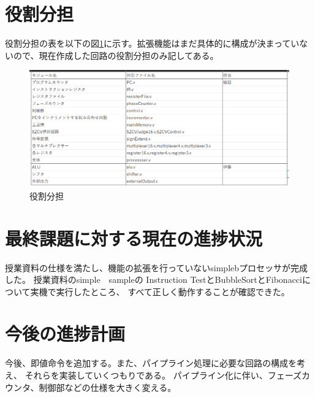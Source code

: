 \documentclass[a4j,titlepage]{jarticle}
\begin{document}
\section{役割分担}

役割分担の表を以下の図\ref{rolesDivision0422}に示す。拡張機能はまだ具体的に構成が決まっていないので、現在作成した回路の役割分担のみ記してある。




\begin{figure}[H]
    \begin{center}
        \includegraphics[scale = 0.43]{rolesDivision0506.png}
    \end{center}
    \caption{役割分担}
    \label{rolesDivision0422}
\end{figure}

\section{最終課題に対する現在の進捗状況}
授業資料の仕様を満たし、機能の拡張を行っていないsimplebプロセッサが完成した。
授業資料のsimple　sampleの
Instruction TestとBubbleSortとFibonacciについて実機で実行したところ、
すべて正しく動作することが確認できた。
\section{今後の進捗計画}
今後、即値命令を追加する。また、パイプライン処理に必要な回路の構成を考え、
それらを実装していくつもりである。
パイプライン化に伴い、フェーズカウンタ、制御部などの仕様を大きく変える。
\end{document}
